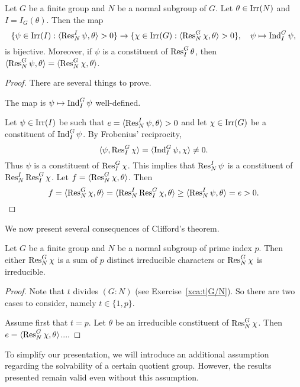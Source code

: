 \begin{theorem}
    Let $G$ be a finite group and $N$ be a normal subgroup of $G$. Let $\theta\in\operatorname{Irr}(N)$ and $I=I_G(\theta)$.  Then 
    the map 
    \[
    \{\psi\in\operatorname{Irr}(I):\langle\operatorname{Res}_N^I\psi,\theta\rangle>0\}\to 
    \{\chi\in\operatorname{Irr}(G):\langle\operatorname{Res}_N^G\chi,\theta\rangle>0\},\quad 
    \psi\mapsto\operatorname{Ind}_I^G\psi,
    \]
    is bijective. Moreover, if $\psi$ is a constituent of $\operatorname{Res}_I^G\theta$, then 
    $\langle\operatorname{Res}_N^G\psi,\theta\rangle=\langle\operatorname{Res}_N^G\chi,\theta\rangle$. 
\end{theorem}

\begin{proof}
    There are several things to prove. 

    \begin{claim}
        The map is $\psi\mapsto\operatorname{Ind}_I^G\psi$ well-defined. 
    \end{claim}

    Let $\psi\in\operatorname{Irr}(I)$ be such that $e=\langle\operatorname{Res}_N^I\psi,\theta\rangle>0$ and 
    let $\chi\in\operatorname{Irr}(G)$ be a constituent of $\operatorname{Ind}_I^G\psi$. By Frobenius' reciprocity, 
    \[
    \langle\psi,\operatorname{Res}_I^G\chi\rangle=\langle\operatorname{Ind}_I^G\psi,\chi\rangle\ne0.
    \]
    Thus $\psi$ is a constituent of $\operatorname{Res}_I^G\chi$. This implies that 
    $\operatorname{Res}_N^I\psi$ is a constituent of $\operatorname{Res}_N^I\operatorname{Res}_I^G\chi$. Let $f=\langle\operatorname{Res}_N^G\chi,\theta\rangle$. Then 
    \[
    f=\langle\operatorname{Res}_N^G\chi,\theta\rangle=\langle\operatorname{Res}_N^I\operatorname{Res}_I^G\chi,\theta\rangle
    \geq\langle\operatorname{Res}_N^I\psi,\theta\rangle=e>0.
    \]
\end{proof}

We now present several consequences of Clifford’s theorem.

\begin{theorem}
    Let $G$ be a finite group and $N$ be a normal subgroup of prime index $p$. Then either $\operatorname{Res}_N^G\chi$ is a sum of $p$ 
    distinct irreducible characters or $\operatorname{Res}_N^G\chi$ is irreducible. 
\end{theorem}

\begin{proof}
    Note that $t$ divides $(G:N)$ (see Exercise~\ref{xca:t|G/N}). 
    So there are two cases
    to consider, namely $t\in\{1,p\}$. 

    Assume first that $t=p$. Let $\theta$ be an irreducible constituent of $\operatorname{Res}_N^G\chi$. Then $e=\langle\operatorname{Res}_N^G\chi,\theta\rangle$.... 
\end{proof}

To simplify our presentation, we will introduce an additional assumption regarding the solvability of a certain quotient group. However, the results presented remain valid even without this assumption.

